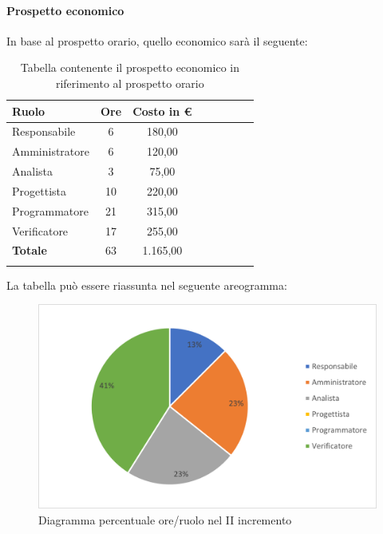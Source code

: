 \paragraph{Prospetto economico}
In base al prospetto orario, quello economico sarà il seguente:

\begin{longtable}{|l|c|c|c|c|c|c|c|}
	\hline
	\rowcolor{lighter-grayer}
	\textbf{Ruolo}  & \textbf{Ore} & \textbf{Costo in €} \\
	\hline
	\endfirsthead

	\hline
	Responsabile    & 6            & 180,00              \\
	\hline
	\hline
	Amministratore  & 6           & 120,00              \\
	\hline
	\hline
	Analista        & 3           & 75,00              \\
	\hline
	\hline
	Progettista     & 10            & 220,00                   \\
	\hline
	\hline
	Programmatore   & 21            & 315,00                   \\
	\hline
	\hline
	Verificatore    & 17           & 255,00              \\
	\hline
	\hline
	\textbf{Totale} & 63           & 1.165,00            \\
	\hline
	\rowcolor{white}
	\caption{Tabella contenente il prospetto economico in riferimento al prospetto orario}
\end{longtable}
\pagebreak

La tabella può essere riassunta nel seguente areogramma:
\begin{figure}[H]
	\centering
	\includegraphics[width=0.8\linewidth]{res/images/preventivo/dettaglio_analisi/2-2.png}
	\caption{Diagramma percentuale ore/ruolo nel II incremento}
	\label{fig:diagramma costi ruolo II incremento}
\end{figure}

